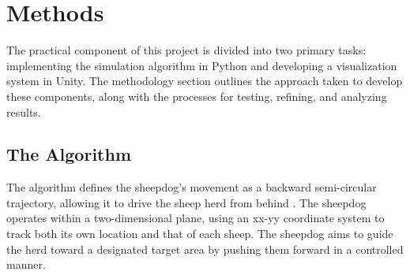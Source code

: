 \documentclass[9pt]{pnas-new}
\begin{document}

\section*{Methods}

The practical component of this project is divided into two primary tasks: implementing the simulation algorithm in Python and developing a visualization system in Unity. The methodology section outlines the approach taken to develop these components, along with the processes for testing, refining, and analyzing results.

\subsection*{The Algorithm}
The algorithm defines the sheepdog’s movement as a backward semi-circular trajectory, allowing it to drive the sheep herd from behind \cite{liu2021}. The sheepdog operates within a two-dimensional plane, using an xx-yy coordinate system to track both its own location and that of each sheep. The sheepdog aims to guide the herd toward a designated target area by pushing them forward in a controlled manner.
\end{document}
